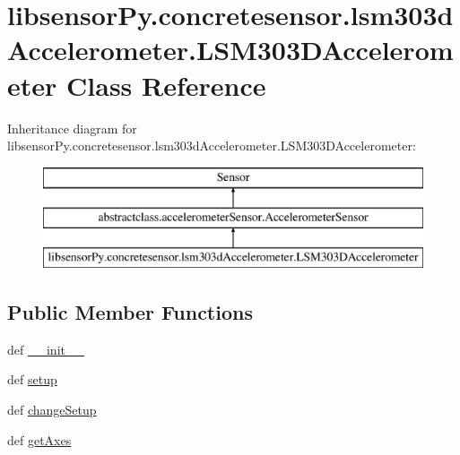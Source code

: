 \hypertarget{classlibsensorPy_1_1concretesensor_1_1lsm303dAccelerometer_1_1LSM303DAccelerometer}{}\section{libsensor\+Py.\+concretesensor.\+lsm303d\+Accelerometer.\+L\+S\+M303\+D\+Accelerometer Class Reference}
\label{classlibsensorPy_1_1concretesensor_1_1lsm303dAccelerometer_1_1LSM303DAccelerometer}
Inheritance diagram for libsensor\+Py.\+concretesensor.\+lsm303d\+Accelerometer.\+L\+S\+M303\+D\+Accelerometer\+:\begin{figure}[H]
\begin{center}
\leavevmode
\includegraphics[height=3.000000cm]{classlibsensorPy_1_1concretesensor_1_1lsm303dAccelerometer_1_1LSM303DAccelerometer}
\end{center}
\end{figure}
\subsection*{Public Member Functions}
\begin{DoxyCompactItemize}
\item 
def \hyperlink{classlibsensorPy_1_1concretesensor_1_1lsm303dAccelerometer_1_1LSM303DAccelerometer_a13fb3cce8f47604a9eda55c52dd89f3e}{\+\_\+\+\_\+init\+\_\+\+\_\+}
\item 
def \hyperlink{classlibsensorPy_1_1concretesensor_1_1lsm303dAccelerometer_1_1LSM303DAccelerometer_a077a84579f1fc1acfd78d87f86472866}{setup}
\item 
def \hyperlink{classlibsensorPy_1_1concretesensor_1_1lsm303dAccelerometer_1_1LSM303DAccelerometer_a528213e1a10c4574cfba0bd403cf3dfe}{change\+Setup}
\item 
def \hyperlink{classlibsensorPy_1_1concretesensor_1_1lsm303dAccelerometer_1_1LSM303DAccelerometer_adc2b6459b5d0dd0f10b408ebdb53a8a0}{get\+Axes}
\end{DoxyCompactItemize}
